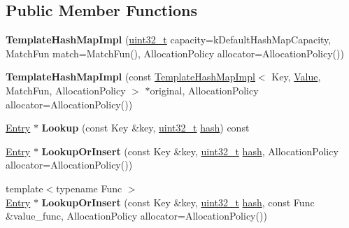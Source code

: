 \subsection*{Public Member Functions}
\begin{DoxyCompactItemize}
\item 
\mbox{\label{classv8_1_1base_1_1TemplateHashMapImpl_a450e2701b83dfac99facefc875ce59bd}} 
{\bfseries Template\+Hash\+Map\+Impl} (\mbox{\hyperlink{classuint32__t}{uint32\+\_\+t}} capacity=k\+Default\+Hash\+Map\+Capacity, Match\+Fun match=Match\+Fun(), Allocation\+Policy allocator=Allocation\+Policy())
\item 
\mbox{\label{classv8_1_1base_1_1TemplateHashMapImpl_aebdd53ff8135ef45b32c1b743ce09c35}} 
{\bfseries Template\+Hash\+Map\+Impl} (const \mbox{\hyperlink{classv8_1_1base_1_1TemplateHashMapImpl}{Template\+Hash\+Map\+Impl}}$<$ Key, \mbox{\hyperlink{classv8_1_1Value}{Value}}, Match\+Fun, Allocation\+Policy $>$ $\ast$original, Allocation\+Policy allocator=Allocation\+Policy())
\item 
\mbox{\label{classv8_1_1base_1_1TemplateHashMapImpl_aa951049632c635dc901bee3a69f074e6}} 
\mbox{\hyperlink{structv8_1_1base_1_1TemplateHashMapEntry}{Entry}} $\ast$ {\bfseries Lookup} (const Key \&key, \mbox{\hyperlink{classuint32__t}{uint32\+\_\+t}} \mbox{\hyperlink{structv8_1_1base_1_1hash}{hash}}) const
\item 
\mbox{\label{classv8_1_1base_1_1TemplateHashMapImpl_a3e1f2854d9a3bf140aef707f8f124d04}} 
\mbox{\hyperlink{structv8_1_1base_1_1TemplateHashMapEntry}{Entry}} $\ast$ {\bfseries Lookup\+Or\+Insert} (const Key \&key, \mbox{\hyperlink{classuint32__t}{uint32\+\_\+t}} \mbox{\hyperlink{structv8_1_1base_1_1hash}{hash}}, Allocation\+Policy allocator=Allocation\+Policy())
\item 
\mbox{\label{classv8_1_1base_1_1TemplateHashMapImpl_a5569d3a9e1f4b0f40c544cc9fe18f5be}} 
{\footnotesize template$<$typename Func $>$ }\\\mbox{\hyperlink{structv8_1_1base_1_1TemplateHashMapEntry}{Entry}} $\ast$ {\bfseries Lookup\+Or\+Insert} (const Key \&key, \mbox{\hyperlink{classuint32__t}{uint32\+\_\+t}} \mbox{\hyperlink{structv8_1_1base_1_1hash}{hash}}, const Func \&value\+\_\+func, Allocation\+Policy allocator=Allocation\+Policy())

\end{DoxyCompactItemize}
